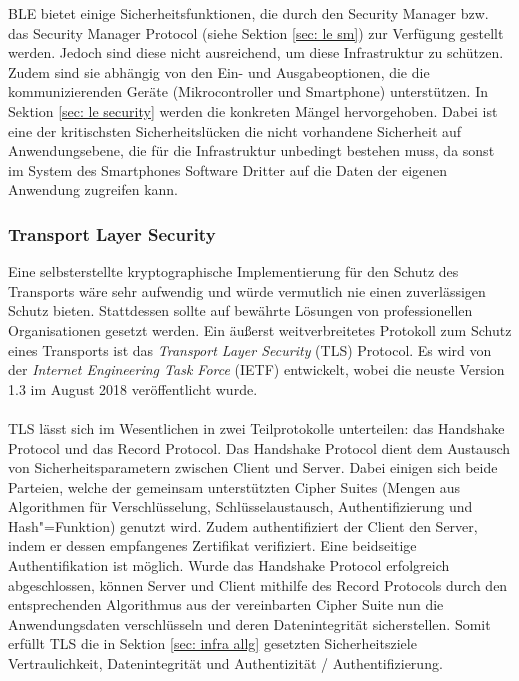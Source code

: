 BLE bietet einige Sicherheitsfunktionen, die durch den Security Manager bzw. das Security Manager Protocol (siehe Sektion \ref{sec: le sm}) zur Verfügung gestellt werden. Jedoch sind diese nicht ausreichend, um diese Infrastruktur zu schützen. Zudem sind sie abhängig von den Ein- und Ausgabeoptionen, die die kommunizierenden Geräte (Mikrocontroller und Smartphone) unterstützen. In Sektion \ref{sec: le security} werden die konkreten Mängel hervorgehoben. Dabei ist eine der kritischsten Sicherheitslücken die nicht vorhandene Sicherheit auf Anwendungsebene, die für die Infrastruktur unbedingt bestehen muss, da sonst im System des Smartphones Software Dritter auf die Daten der eigenen Anwendung zugreifen kann.

\subsubsection{Transport Layer Security}
Eine selbsterstellte kryptographische Implementierung für den Schutz des Transports wäre sehr aufwendig und würde vermutlich nie einen zuverlässigen Schutz bieten. Stattdessen sollte auf bewährte Lösungen von professionellen Organisationen gesetzt werden. Ein äußerst weitverbreitetes Protokoll zum Schutz eines Transports ist das \textit{Transport Layer Security} (TLS) Protocol. Es wird von der \textit{Internet Engineering Task Force} (IETF) entwickelt, wobei die neuste Version 1.3 im August 2018 veröffentlicht wurde.
\\\\
TLS lässt sich im Wesentlichen in zwei Teilprotokolle unterteilen: das Handshake Protocol und das Record Protocol. Das Handshake Protocol dient dem Austausch von Sicherheitsparametern zwischen Client und Server. Dabei einigen sich beide Parteien, welche der gemeinsam unterstützten Cipher Suites (Mengen aus Algorithmen für Verschlüsselung, Schlüsselaustausch, Authentifizierung und Hash"=Funktion) genutzt wird. Zudem authentifiziert der Client den Server, indem er dessen empfangenes Zertifikat verifiziert. Eine beidseitige Authentifikation ist möglich. Wurde das Handshake Protocol erfolgreich abgeschlossen, können Server und Client mithilfe des Record Protocols durch den entsprechenden Algorithmus aus der vereinbarten Cipher Suite nun die Anwendungsdaten verschlüsseln und deren Datenintegrität sicherstellen. Somit erfüllt TLS die in Sektion \ref{sec: infra allg} gesetzten Sicherheitsziele Vertraulichkeit, Datenintegrität und Authentizität / Authentifizierung. \cite{RFC8446_24-33}
\\\\
